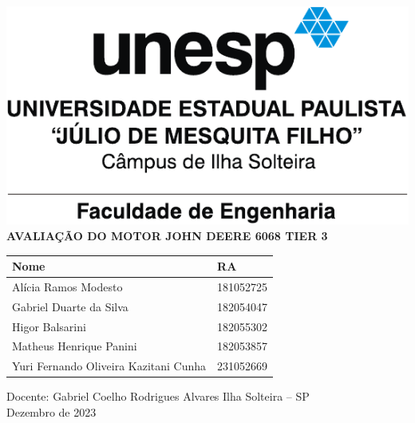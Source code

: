 \documentclass[
    12pt,                %
    brazil               %
    openany,             %
    oneside,             %
    chapter=TITLE,       %
]{abntex2}
\renewcommand{\imprimircapa}{%
    \begin{center}\sffamily
        \includegraphics{./figuras/feis_unesp.pdf}
        \vfill
        {\bfseries\large AVALIAÇÃO DO MOTOR JOHN DEERE 6068 TIER 3}
        \vfill
        \begin{tabular}{ll}
            Nome & RA \\ \hline
            Alícia Ramos Modesto                  & 181052725 \\
            Gabriel Duarte da Silva               & 182054047 \\
            Higor Balsarini                       & 182055302 \\
            Matheus Henrique Panini               & 182053857 \\
            Yuri Fernando Oliveira Kazitani Cunha & 231052669
        \end{tabular}
        \vfill
        Docente: Gabriel Coelho Rodrigues Alvares
        \vfill
        Ilha Solteira -- SP \\
        Dezembro de 2023
    \end{center}
    \clearpage
}
\begin{document}
%
\imprimircapa\clearpage    %
\chapter*{}
\listoffigures\clearpage   %
\listoftables\clearpage    %
\tableofcontents\clearpage %

\textual






\printbibliography
	
\end{document}
